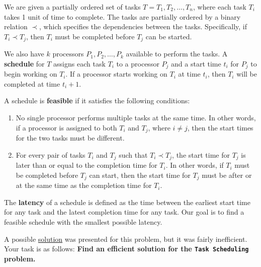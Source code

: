 \documentclass{article}
\begin{document}
    \begin{tcolorbox}[
    enhanced, colback={green!40!black}, colupper=white, colframe=brown!70!black,
    sharp corners,drop fuzzy shadow,
    underlay={\tcbvignette{size=2mm, inside node=frame, raised color=brown!70!black}}]
    {
        \vspace{2mm} We are given a partially ordered set of tasks $T = {T_{1}, T_{2}, \dots, T_{n}}$, where each task $T_{i}$ takes 1 unit of time to complete. The tasks are partially ordered by a binary relation $\prec$, which specifies the dependencies between the tasks. Specifically, if $T_{i} \prec T_{j}$, then $T_{i}$ must be completed before $T_{j}$ can be started.
    
        \vspace{3mm}
        We also have $k$ processors $P_{1}, P_{2}, \dots, P_{k}$ available to perform the tasks. A \textbf{schedule} for $T$ assigns each task $T_{i}$ to a processor $P_{j}$ and a start time $t_{i}$ for $P_{j}$ to begin working on $T_{i}$. If a processor starts working on $T_{i}$ at time $t_{i}$, then $T_{i}$ will be completed at time $t_{i} + 1$.
    
        \vspace{3mm} A schedule is \textbf{feasible} if it satisfies the following conditions:
        \begin{enumerate}[label = \arabic*]
            \item No single processor performs multiple tasks at the same time. In other words, if a processor is assigned to both $T_{i}$ and $T_{j}$, where $i \ne j$, then the start times for the two tasks must be different.
            \item For every pair of tasks $T_{i}$ and $T_{j}$ such that $T_{i} \prec T_{j}$, the start time for $T_{j}$ is later than or equal to the completion time for $T_{i}$. In other words, if $T_{i}$ must be completed before $T_{j}$ can start, then the start time for $T_{j}$ must be after or at the same time as the completion time for $T_{i}$.
        \end{enumerate}
        The \textbf{latency} of a schedule is defined as the time between the earliest start time for any task and the latest completion time for any task. Our goal is to find a feasible schedule with the smallest possible latency.
        }
    \end{tcolorbox}
    
    A possible \href{https://github.com/sar-mo/CS2051-HonorsDiscreteMath/blob/main/sp23/hw-supplements/hw5-supp-slns/generate_schedule_sln.pdf}{solution} was presented for this problem, but it was fairly inefficient. Your task is as follows: \textbf{Find an efficient solution for the \texttt{Task Scheduling} problem.} 
\end{document}
